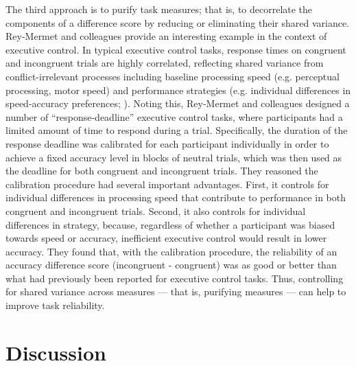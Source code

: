 \documentclass[a4paper,notitlepage,12pt]{article}
\begin{document}
The third approach is to purify task measures; that is, to decorrelate the components of a difference score by reducing or eliminating their shared variance. Rey-Mermet and colleagues \cite{rey2019executive} provide an interesting example in the context of executive control. In typical executive control tasks, response times on congruent and incongruent trials are highly correlated, reflecting shared variance from conflict-irrelevant processes including baseline processing speed (e.g. perceptual processing, motor speed) and performance strategies (e.g. individual differences in speed-accuracy preferences; \cite{draheim2019reaction}). Noting this, Rey-Mermet and colleagues designed a number of ``response-deadline'' executive control tasks, where participants had a limited amount of time to respond during a trial. Specifically, the duration of the response deadline was calibrated for each participant individually in order to achieve a fixed accuracy level in blocks of neutral trials, which was then used as the deadline for both congruent and incongruent trials. They reasoned the calibration procedure had several important advantages. First, it controls for individual differences in processing speed that contribute to performance in both congruent and incongruent trials. Second, it also controls for individual differences in strategy, because, regardless of whether a participant was biased towards speed or accuracy, inefficient executive control would result in lower accuracy. They found that, with the calibration procedure, the reliability of an accuracy difference score (incongruent - congruent) was as good or better than what had previously been reported for executive control tasks. Thus, controlling for shared variance across measures --- that is, purifying measures --- can help to improve task reliability.

\section{Discussion}

\printbibliography
\end{document}
